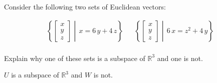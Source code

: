 
\begin{exerciseStatement}


Consider the following two sets of Euclidean vectors: 


\begin{align*}  \left\{ \left[\begin{array}{c}
x \\
y \\
z
\end{array}\right] \middle|\,x = 6 \, y + 4 \, z\right\}  & &   \left\{ \left[\begin{array}{c}
x \\
y \\
z
\end{array}\right] \middle|\,6 \, x = z^{2} + 4 \, y\right\}  \\ \end{align*}
            

 Explain why one of these sets is a subspace of \(\mathbb{R}^ 3 \) and one is not. 


\end{exerciseStatement}
    
\begin{exerciseAnswer} 


\(U\) is a subspace of \(\mathbb{R}^ 3 \) and \(W\) is not.


\end{exerciseAnswer}
    
